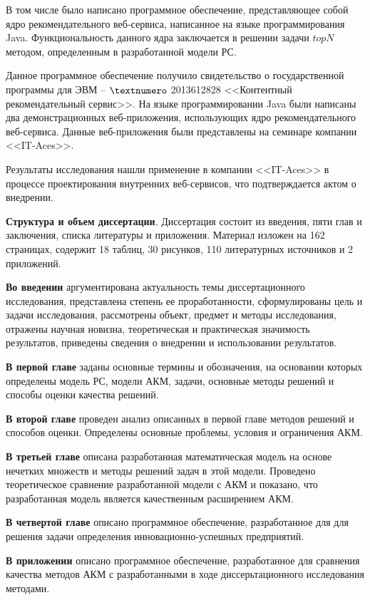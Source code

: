 В том числе было написано программное обеспечение, представляющее собой ядро
рекомендательного веб-сервиса, написанное на языке программирования Java.
Функциональность данного ядра заключается в решении задачи $topN$
методом, определенным в разработанной модели РС.

Данное программное обеспечение получило свидетельство
о государственной программы для ЭВМ – $\textnumero$ 2013612828 <<Контентный
рекомендательный сервис>>. На языке программировании Java были написаны
два демонстрационных веб-приложения, использующих ядро рекомендательного
веб-сервиса. Данные веб-приложения были представлены на семинаре компании <<IT-Aces>>.

Результаты исследования нашли применение в компании
<<IT-Aces>> в процессе проектирования внутренних веб-сервисов, что
подтверждается актом о внедрении.

{\bf Структура и объем диссертации}. Диссертация состоит из введения, пяти глав
и заключения, списка литературы и приложения. Материал изложен на 162
страницах, содержит 18 таблиц, 30 рисунков, 110 литературных источников и 2
приложений.

{\bf Во  введении} аргументирована  актуальность  темы  диссертационного
исследования, представлена степень ее проработанности, сформулированы цель и
задачи  исследования,  рассмотрены  объект,  предмет  и  методы  исследования,
отражены научная новизна, теоретическая и практическая значимость результатов,
приведены сведения о внедрении и использовании результатов.

{\bf В первой главе} заданы основные термины и обозначения, на основании
которых определены модель РС, модели АКМ, задачи, основные методы решений и способы оценки качества решений.

{\bf В второй главе} проведен анализ описанных в первой главе методов решений
и способов оценки. Определены основные проблемы, условия и ограничения АКМ.

{\bf В третьей главе} описана разработанная математическая модель на основе
нечетких множеств и методы решений задач в этой модели. Проведено теоретическое
сравнение разработанной модели с АКМ и показано, что разработанная модель
является качественным расширением АКМ.

{\bf В четвертой главе} описано программное обеспечение, разработанное для
для решения задачи определения инновационно-успешных предприятий.

{\bf В приложении} описано программное обеспечение, разработанное для
сравнения качества методов АКМ с разработанными в ходе диссерьтационного исследования методами.

\hfill \break

